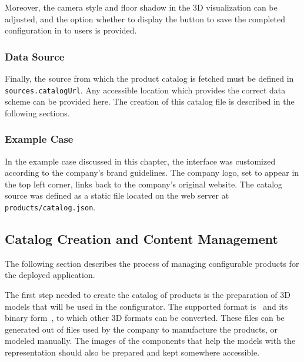 Moreover, the camera style and floor shadow in the 3D visualization can be adjusted, and the option whether to display the button to save the completed configuration in  to users is provided.


\subsubsection{Data Source}

Finally, the source from which the product catalog is fetched must be defined in \texttt{sources.catalogUrl}. Any accessible location which provides the correct data scheme can be provided here. The creation of this catalog file is described in the following sections.


\subsubsection{Example Case}

In the example case discussed in this chapter, the interface was customized according to the company's brand guidelines. The company logo, set to appear in the top left corner, links back to the company's original website. The catalog source was defined as a static file located on the web server at \texttt{products/catalog.json}.


\subsection{Catalog Creation and Content Management}

The following section describes the process of managing configurable products for the deployed application.

The first step needed to create the catalog of products is the preparation of 3D models that will be used in the configurator. The supported format is~ and its binary form~, to which other 3D formats can be converted. These files can be generated out of  files used by the company to manufacture the products, or modeled manually. The images of the components that help the models with the representation should also be prepared and kept somewhere accessible.

